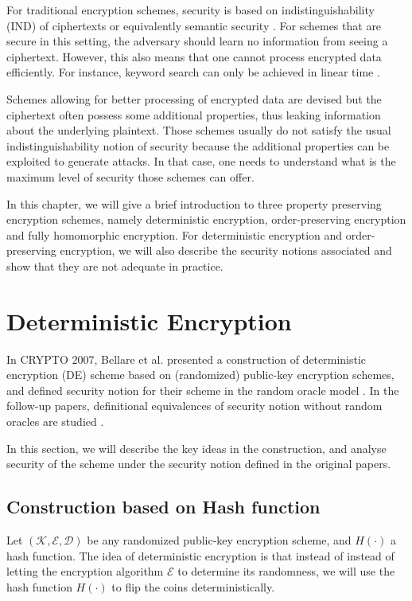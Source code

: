 For traditional encryption schemes, security is based on indistinguishability (IND) of ciphertexts \cite{GOLDWASSER1984270} or equivalently semantic security \cite{Goldwasser:1982:PEA:800070.802212}. For schemes that are secure in this setting, the adversary should learn no information from seeing a ciphertext. However, this also means that one cannot process encrypted data efficiently. For instance, keyword search can only be achieved in linear time \cite{Boneh2004, Song:2000:PTS:882494.884426}.

Schemes allowing for better processing of encrypted data are devised but the ciphertext often possess some additional properties, thus leaking information about the underlying plaintext. Those schemes usually do not satisfy the usual indistinguishability notion of security because the additional properties can be exploited to generate attacks. In that case, one needs to understand what is the maximum level of security those schemes can offer.

In this chapter, we will give a brief introduction to three property preserving encryption schemes, namely deterministic encryption, order-preserving encryption and fully homomorphic encryption. For deterministic encryption and order-preserving encryption, we will also describe the security notions associated and show that they are not adequate in practice.




\section{Deterministic Encryption}
In CRYPTO 2007, Bellare et al. presented a construction of deterministic encryption (DE) scheme based on (randomized) public-key encryption schemes, and defined security notion for their scheme in the random oracle model \cite{Bellare2007}. In the follow-up papers, definitional equivalences of security notion without random oracles are studied \cite{Bellare2008, Boldyreva2008}.

In this section, we will describe the key ideas in the construction, and analyse security of the scheme under the security notion defined in the original papers.


\subsection{Construction based on Hash function}
Let $(\mathcal{K}, \mathcal{E}, \mathcal{D})$ be any randomized public-key encryption scheme, and $H(\cdot)$ a hash function. The idea of deterministic encryption is that instead of instead of letting the encryption algorithm $\mathcal{E}$ to determine its randomness, we will use the hash function $H(\cdot)$ to flip the coins deterministically.

